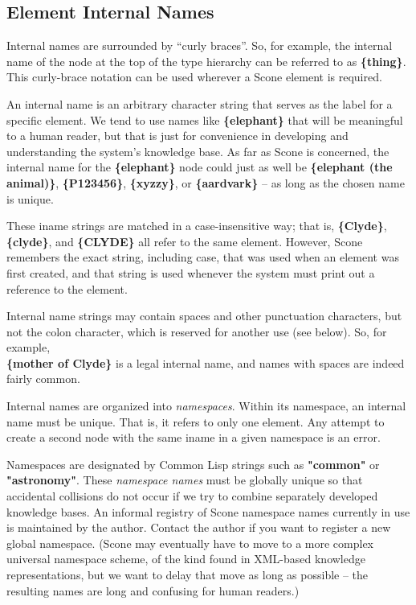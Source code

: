 \documentclass[titlepage,twoside,openright,11pt]{article}
\begin{document}
\subsection{Element Internal Names}\label{element-internal-names}

Internal names are surrounded by ``curly braces''. So, for example, the
internal name of the node at the top of the type hierarchy can be
referred to as \textbf{\{thing\}}. This curly-brace notation can be used
wherever a Scone element is required.

An internal name is an arbitrary character string that serves as the
label for a specific element. We tend to use names like
\textbf{\{elephant\}} that will be meaningful to a human reader, but
that is just for convenience in developing and understanding the
system's knowledge base. As far as Scone is concerned, the internal name
for the \textbf{\{elephant\}} node could just as well be
\textbf{\{elephant (the animal)\}}, \textbf{\{P123456\}},
\textbf{\{xyzzy\}}, or \textbf{\{aardvark\}} -- as long as the chosen
name is unique.

These iname strings are matched in a case-insensitive way; that is,
\textbf{\{Clyde\}}, \textbf{\{clyde\}}, and \textbf{\{CLYDE\}} all refer
to the same element. However, Scone remembers the exact string,
including case, that was used when an element was first created, and
that string is used whenever the system must print out a reference to
the element.

Internal name strings may contain spaces and other punctuation
characters, but not the colon character, which is reserved for another
use (see below). So, for example,\\
\textbf{\{mother of Clyde\}} is a legal internal name, and names with
spaces are indeed fairly common.

Internal names are organized into \emph{namespaces}. Within its
namespace, an internal name must be unique. That is, it refers to only
one element. Any attempt to create a second node with the same iname in
a given namespace is an error.

Namespaces are designated by Common Lisp strings such as
\textbf{"common"} or \textbf{"astronomy"}. These \emph{namespace names}
must be globally unique so that accidental collisions do not occur if we
try to combine separately developed knowledge bases. An informal
registry of Scone namespace names currently in use is maintained by the
author. Contact the author if you want to register a new global
namespace. (Scone may eventually have to move to a more complex
universal namespace scheme, of the kind found in XML-based knowledge
representations, but we want to delay that move as long as possible --
the resulting names are long and confusing for human readers.)
\end{document}
